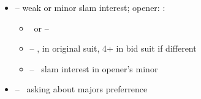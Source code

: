 \begin{itemize}
  \item \ctr{3\c} -- weak or minor slam interest; opener: :
  \begin{itemize}
    \item \pass\ or \ctr{4\c} -- \so
    \item \ctr{3\major} -- \gf,  in original suit, 4+ in bid suit if different
    \item \ctr{3\nt} -- \force\ slam interest in opener's minor
  \end{itemize}
  \item \ctr{3\d} -- \gf\ asking about majors preferrence
\end{itemize}
